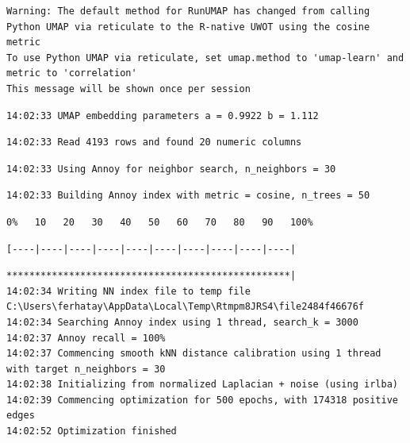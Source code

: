 \documentclass[
  letterpaper,
  DIV=11,
  numbers=noendperiod]{scrartcl}
\begin{document}
\begin{verbatim}
Warning: The default method for RunUMAP has changed from calling Python UMAP via reticulate to the R-native UWOT using the cosine metric
To use Python UMAP via reticulate, set umap.method to 'umap-learn' and metric to 'correlation'
This message will be shown once per session
\end{verbatim}

\begin{verbatim}
14:02:33 UMAP embedding parameters a = 0.9922 b = 1.112
\end{verbatim}

\begin{verbatim}
14:02:33 Read 4193 rows and found 20 numeric columns
\end{verbatim}

\begin{verbatim}
14:02:33 Using Annoy for neighbor search, n_neighbors = 30
\end{verbatim}

\begin{verbatim}
14:02:33 Building Annoy index with metric = cosine, n_trees = 50
\end{verbatim}

\begin{verbatim}
0%   10   20   30   40   50   60   70   80   90   100%
\end{verbatim}

\begin{verbatim}
[----|----|----|----|----|----|----|----|----|----|
\end{verbatim}

\begin{verbatim}
**************************************************|
14:02:34 Writing NN index file to temp file C:\Users\ferhatay\AppData\Local\Temp\Rtmpm8JRS4\file2484f46676f
14:02:34 Searching Annoy index using 1 thread, search_k = 3000
14:02:37 Annoy recall = 100%
14:02:37 Commencing smooth kNN distance calibration using 1 thread with target n_neighbors = 30
14:02:38 Initializing from normalized Laplacian + noise (using irlba)
14:02:39 Commencing optimization for 500 epochs, with 174318 positive edges
14:02:52 Optimization finished
\end{verbatim}
\end{document}
